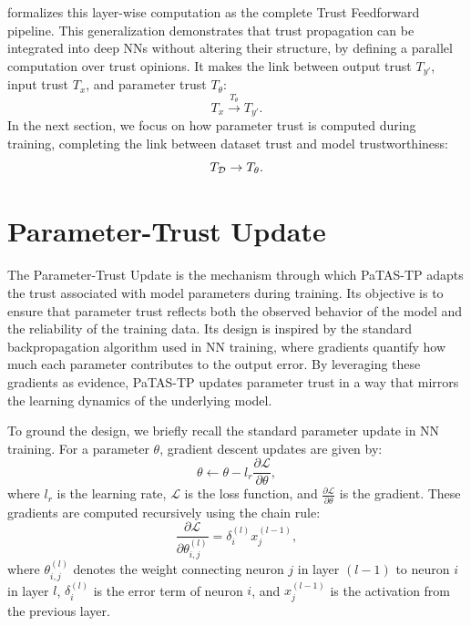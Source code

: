 \DIFaddend {} formalizes this layer-wise computation as the complete Trust Feedforward pipeline. This generalization demonstrates that trust propagation can be integrated into deep \acp{NN} without altering their structure, by defining a parallel computation over trust opinions. It makes the link between output trust $T_{y'}$, input trust $T_{x}$, and parameter trust $T_{\theta}$: 
\[T_{x} \xrightarrow{T_\theta} T_{y'}.\] In the next section, we focus on how parameter trust is computed during training, completing the link between dataset trust and model trustworthiness:
\[T_{\mathcal{D}} \rightarrow T_\theta.\] 

\section{Parameter-Trust Update}\label{sec:param_update}
The Parameter-Trust Update is the mechanism through which \ac{PaTAS-TP} adapts the trust associated with model parameters during training. Its objective is to ensure that parameter trust reflects both the observed behavior of the model and the reliability of the training data. Its design is inspired by the standard backpropagation algorithm used in \ac{NN} training, where gradients quantify how much each parameter contributes to the output error. By leveraging these gradients as evidence, \ac{PaTAS-TP} updates parameter trust in a way that mirrors the learning dynamics of the underlying model.

To ground the design, we briefly recall the standard parameter update in \ac{NN} training. For a parameter $\theta$, gradient descent updates are given by:
\begin{equation}
\label{eq:gd1}
\theta \leftarrow \theta - l_r  \frac{\partial \mathcal{L}}{\partial \theta},
\end{equation}
where $l_r$ is the learning rate, $\mathcal{L}$ is the loss function, and $\frac{\partial \mathcal{L}}{\partial \theta}$ is the gradient. These gradients are computed recursively using the chain rule:
\begin{equation}
\label{eq:gd2}
\frac{\partial \mathcal{L}}{\partial \theta^{(l)}_{i,j}}
= \delta^{(l)}_i x^{(l-1)}_j,
\end{equation}
where $\theta^{(l)}_{i,j}$ denotes the weight connecting neuron $j$ in layer $(l-1)$ to neuron $i$ in layer $l$, $\delta^{(l)}_i$ is the error term of neuron $i$, and $x^{(l-1)}_j$ is the activation from the previous layer.

